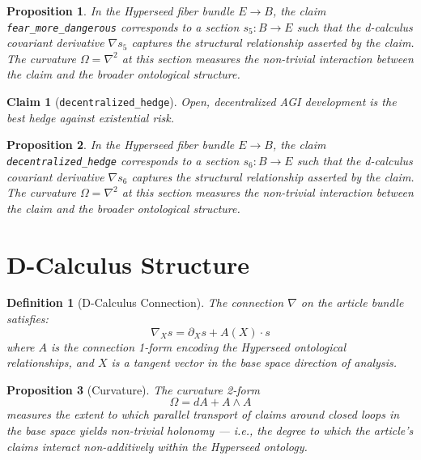 \documentclass{article}
\newtheorem{claim}{Claim}
\newtheorem{definition}{Definition}
\newtheorem{proposition}{Proposition}
\begin{document}
\begin{proposition}
In the Hyperseed fiber bundle $E \to B$, the claim \texttt{fear_more_dangerous} corresponds to a section $s_5: B \to E$ such that the d-calculus covariant derivative $\nabla s_5$ captures the structural relationship asserted by the claim. The curvature $\Omega = \nabla^2$ at this section measures the non-trivial interaction between the claim and the broader ontological structure.
\end{proposition}

\begin{claim}[\texttt{decentralized_hedge}]
Open, decentralized AGI development is the best hedge against existential risk.
\end{claim}

\begin{proposition}
In the Hyperseed fiber bundle $E \to B$, the claim \texttt{decentralized_hedge} corresponds to a section $s_6: B \to E$ such that the d-calculus covariant derivative $\nabla s_6$ captures the structural relationship asserted by the claim. The curvature $\Omega = \nabla^2$ at this section measures the non-trivial interaction between the claim and the broader ontological structure.
\end{proposition}

\section{D-Calculus Structure}

\begin{definition}[D-Calculus Connection]
The connection $\nabla$ on the article bundle satisfies:
\begin{equation}
  \nabla_X s = \partial_X s + A(X) \cdot s
\end{equation}
where $A$ is the connection 1-form encoding the Hyperseed ontological relationships, and $X$ is a tangent vector in the base space direction of analysis.
\end{definition}

\begin{proposition}[Curvature]
The curvature 2-form
\begin{equation}
  \Omega = dA + A \wedge A
\end{equation}
measures the extent to which parallel transport of claims around closed loops in the base space yields non-trivial holonomy --- i.e., the degree to which the article's claims interact non-additively within the Hyperseed ontology.
\end{proposition}
\end{document}
